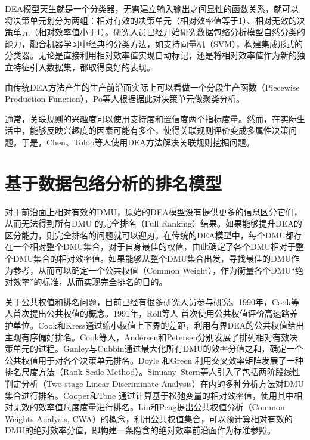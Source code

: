DEA模型天生就是一个分类器，无需建立输入输出之间显性的函数关系，就可以将决策单元划分为两组：相对有效的决策单元（相对效率值等于1）、相对无效的决策单元（相对效率值小于1）。研究人员已经开始研究数据包络分析模型自然分类的能力，融合机器学习中经典的分类方法，如支持向量机（SVM），构建集成形式的分类器\cite{rezaie2013integrated,jiang2013supplier}。无论是直接利用相对效率值实现自动标记\cite{rezaie2013integrated}，还是将相对效率值作为新的独立特征引入数据集\cite{jiang2013supplier}，都取得良好的表现。

由传统DEA方法产生的生产前沿面实际上可以看做一个分段生产函数（Piecewise Production Function），Po等人\cite{po2009cluster}根据据此对决策单元做聚类分析。

通常，关联规则的兴趣度可以使用支持度和置信度两个指标度量。然而，在实际生活中，能够反映兴趣度的因素可能有多个，使得关联规则评价变成多属性决策问题。于是，Chen\cite{chen2007ranking}、Toloo等人\cite{toloo2009discover}使用DEA方法解决关联规则挖掘问题。

\section{基于数据包络分析的排名模型}
对于前沿面上相对有效的DMU，原始的DEA模型没有提供更多的信息区分它们，从而无法得到所有DMU 的完全排名（Full Ranking）结果。如果能够提升DEA的区分能力，则完全排名的问题就可以迎刃。在传统的DEA模型中，每个DMU都存在一个相对整个DMU集合，对于自身最佳的权值，由此确定了各个DMU相对于整个DMU集合的相对效率值。如果能够从整个DMU集合出发，寻找最佳的DMU作为参考，从而可以确定一个公共权值（Common Weight），作为衡量各个DMU“绝对效率”的标准，从而实现完全排名的目的。

关于公共权值和排名问题，目前已经有很多研究人员参与研究。1990年，Cook等人\cite{cook1990data}首次提出公共权值的概念。1991年，Roll等人
\cite{roll1991controlling}首次使用公共权值评价高速路养护单位。Cook和Kress\cite{cook1990data,cook1991multiple}通过缩小权值上下界的差距，利用有界DEA的公共权值给出主观有序偏好排名。Cook等人\cite{cook1992prioritization}，Andersen和Petersen\cite{andersen1993procedure}分别发展了排列相对有效决策单元的过程。Ganley与Cubbin\cite{ganley1992public}通过最大化所有DMU的效率分值之和，确定一个公共权值用于对各个决策单元排名。Doyle 和Green \cite{doyle1994efficiency} 利用交叉效率矩阵发展了一种排名尺度方法（Rank Scale Method）。Sinuany–Stern等人\cite{sinuany1994academic}引入了包括两阶段线性判定分析（Two-stage Linear Discriminate Analysis）在内的多种分析方法对DMU集合进行排名。Cooper和Tone 通过计算基于松弛变量的相对效率值，使用其中相对无效的效率值尺度度量进行排名\cite{cooper1997measures}。Liu和Peng\cite{liu2008rankingdea}提出公共权值分析（Common Weights Analysis, CWA）的概念，利用公共权值集合，可以预计算相对有效的DMU的绝对效率分值，即构建一条隐含的绝对效率前沿面作为标准参照。

